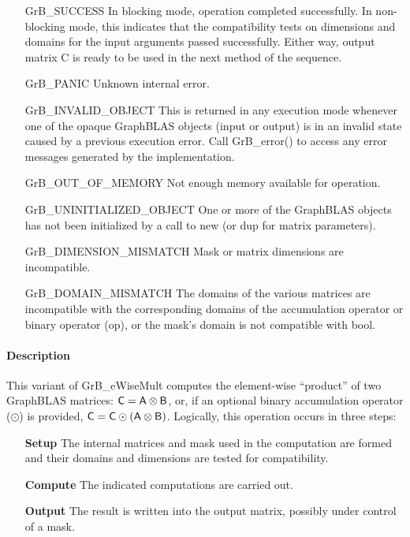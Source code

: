 \begin{itemize}[leftmargin=2.1in]
    \item[{\sf GrB\_SUCCESS}]         In blocking mode, operation completed
    successfully. In non-blocking mode, this indicates that the compatibility 
    tests on dimensions and domains for the input arguments passed successfully. 
    Either way, output matrix {\sf C} is ready to be used in the next method of 
    the sequence.

    \item[{\sf GrB\_PANIC}]           Unknown internal error.
    
    \item[{\sf GrB\_INVALID\_OBJECT}] This is returned in any execution mode 
    whenever one of the opaque GraphBLAS objects (input or output) is in an invalid 
    state caused by a previous execution error.  Call {\sf GrB\_error()} to access 
    any error messages generated by the implementation.

    \item[{\sf GrB\_OUT\_OF\_MEMORY}] Not enough memory available for operation.
    
    \item[{\sf GrB\_UNINITIALIZED\_OBJECT}] One or more of the GraphBLAS objects 
    has not been initialized by a call to {\sf new} (or {\sf dup} for matrix
    parameters).

    \item[{\sf GrB\_DIMENSION\_MISMATCH}] Mask or matrix dimensions are incompatible.

	\item[{\sf GrB\_DOMAIN\_MISMATCH}]    The domains of the various
	matrices are incompatible with the corresponding domains of the
	accumulation operator or binary operator ({\sf op}), or the mask's domain 
    is not compatible with {\sf bool}.
\end{itemize}

\paragraph{Description}

This variant of {\sf GrB\_eWiseMult} computes the element-wise ``product'' of
two GraphBLAS matrices: ${\sf C} = {\sf A} \otimes {\sf B}$, or, if an optional
binary accumulation operator ($\odot$) is provided, ${\sf C} = {\sf C} \odot
\left({\sf A} \otimes {\sf B}\right)$.  Logically, this operation occurs in
three steps:
\begin{enumerate}[leftmargin=0.75in]
\item[\bf Setup] The internal matrices and mask used in the computation are formed 
and their domains and dimensions are tested for compatibility.
\item[\bf Compute] The indicated computations are carried out.
\item[\bf Output] The result is written into the output matrix, possibly under 
control of a mask.
\end{enumerate}

